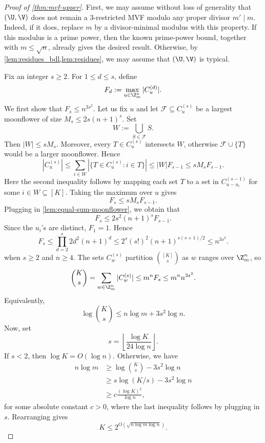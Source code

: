 \documentclass[11pt]{article}
\theoremstyle{definition}
\begin{document}
\begin{proof}[Proof of \cref{thm:mvf-upper}]
First, we may assume without loss of generality that $(\U,\V)$ does not remain a
$3$-restricted MVF modulo any proper divisor $m'\mid m$. Indeed, if it does,
replace $m$ by a divisor-minimal modulus with this property. If this modulus is
a prime power, then the known prime-power bound, together with $m\le\sqrt n$,
already gives the desired result. Otherwise, by
\cref{lem:residues_bdl,lem:residues}, we may assume that $(\U,\V)$ is typical.

Fix an integer $s\ge2$. For $1\le d\le s$, define
\[
F_d:=\max_{u\in\Z_m^n}|C_u^{(d)}|.
\]
We first show that $F_s\le n^{3s^2}$.
Let us fix $u$ and let $\mathcal F\subseteq C_u^{(s)}$ be a largest moonflower of size $M_s \leq 2s(n+1)^s$. Set \[
W:=\bigcup_{S\in\mathcal F}S.
\]
Then $|W|\le sM_s$. Moreover, every $T \in C_u^{(s)}$ intersects $W$, otherwise
$\mathcal F\cup\{T\}$ would be a larger moonflower. Hence
\[
\left |C_u^{(s)} \right|
\le
\sum_{i\in W} \left|\{T\in C_u^{(s)}:i\in T\}\right|
\le |W|F_{s-1}
\le sM_sF_{s-1}.
\]
Here the second inequality follows by mapping each set $T$ to a set in $C_{u-u_i}^{(s-1)}$ for some $i \in W \subseteq [K]$. 
Taking the maximum over $u$ gives
\[
F_s\le sM_sF_{s-1}.
\]
Plugging in \cref{lem:equal-sum-moonflower}, we obtain that
\[
F_s\le 2s^2(n+1)^sF_{s-1}.
\]
Since the $u_i$'s are distinct, $F_1=1$. Hence
\[
F_s\le \prod_{d=2}^s 2d^2(n+1)^d
\le 2^s(s!)^2(n+1)^{s(s+1)/2} \leq n^{3s^2}.
\]
when $s \geq 2$ and $n \geq 4$.
The sets $C_w^{(s)}$ partition $\binom{[K]}s$ as $w$ ranges over $\Z_m^n$, so
\[
\binom Ks
=
\sum_{w\in\Z_m^n}|C_w^{(s)}|
\le
m^nF_s
\le
m^n n^{3s^2}.
\]
Equivalently,
\[
\log\binom Ks\le n\log m+3s^2\log n.
\]
Now, set
\[
s=\left\lfloor \frac{\log K}{24\log n}\right\rfloor .
\]
If $s<2$, then $\log K=O(\log n)$. Otherwise, we have 
\begin{align*}
n\log m
&\ge \log\binom Ks-3s^2\log n \\
&\ge s\log(K/s)-3s^2\log n \\
&\ge c\frac{(\log K)^2}{\log n},
\end{align*}
for some absolute constant $c>0$, where the last inequality follows by plugging in $s$. Rearranging gives
\[
K\le 2^{O(\sqrt{n\log m\log n})}.
\]
\end{proof}




\end{document}
